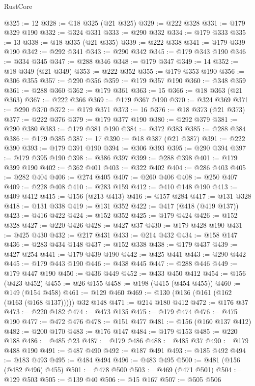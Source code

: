 \begin{lexlean}{RustCore}
\begin{coremodule}
@325 := 12
@328 := @18 @325 (@21 @325)
@329 := @222 @328
@331 := @179 @329 @190
@332 := @324 @331
@333 := @290 @332
@334 := @179 @333
@335 := 13
@338 := @18 @335 (@21 @335)
@339 := @222 @338
@341 := @179 @339 @190
@342 := @292 @341
@343 := @290 @342
@345 := @179 @343 @190
@346 := @334 @345
@347 := @288 @346
@348 := @179 @347
@349 := 14
@352 := @18 @349 (@21 @349)
@353 := @222 @352
@355 := @179 @353 @190
@356 := @306 @355
@357 := @290 @356
@359 := @179 @357 @190
@360 := @348 @359
@361 := @288 @360
@362 := @179 @361
@363 := 15
@366 := @18 @363 (@21 @363)
@367 := @222 @366
@369 := @179 @367 @190
@370 := @324 @369
@371 := @290 @370
@372 := @179 @371
@373 := 16
@376 := @18 @373 (@21 @373)
@377 := @222 @376
@379 := @179 @377 @190
@380 := @292 @379
@381 := @290 @380
@383 := @179 @381 @190
@384 := @372 @383
@385 := @288 @384
@386 := @179 @385
@387 := 17
@390 := @18 @387 (@21 @387)
@391 := @222 @390
@393 := @179 @391 @190
@394 := @306 @393
@395 := @290 @394
@397 := @179 @395 @190
@398 := @386 @397
@399 := @288 @398
@401 := @179 @399 @190
@402 := @362 @401
@403 := @322 @402
@404 := @286 @403
@405 := @282 @404
@406 := @274 @405
@407 := @260 @406
@408 := @250 @407
@409 := @228 @408
@410 := @283 @159
@412 := @410 @148 @190
@413 := @409 @412
@415 := @156 (@213 @413)
@416 := @157 @284
@417 := @131 @328
@418 := @131 @338
@419 := @131 @352
@422 := @417 (@418 (@419 @137))
@423 := @416 @422
@424 := @152 @352
@425 := @179 @424
@426 := @152 @328
@427 := @220 @426
@428 := @427 @37
@430 := @179 @428 @190
@431 := @425 @430
@432 := @217 @431
@433 := @214 @432
@434 := @158 @147
@436 := @283 @434 @148
@437 := @152 @338
@438 := @179 @437
@439 := @427 @254
@441 := @179 @439 @190
@442 := @425 @441
@443 := @290 @442
@445 := @179 @443 @190
@446 := @438 @445
@447 := @288 @446
@449 := @179 @447 @190
@450 := @436 @449
@452 := @433 @450 @412
@454 := @156 (@423 @452)
@455 := @26 @155
@458 := @198 (@415 (@454 @455))
@460 := @149 (@154 @458)
@461 := @129 @460
@469 := @130 (@136 (@161 (@162 (@163 (@168 @137))))) @32 @148
@471 := @214 @180 @412
@472 := @176 @37
@473 := @220 @182
@474 := @473 @135
@475 := @179 @474
@476 := @475 @190
@477 := @472 @476
@478 := @151 @477
@481 := @156 (@160 @137 @412)
@482 := @200 @170
@483 := @176 @147
@484 := @179 @153
@485 := @220 @188
@486 := @485 @23
@487 := @179 @486
@488 := @485 @37
@490 := @179 @488 @190
@491 := @487 @490
@492 := @187 @491
@493 := @185 @492
@494 := @183 @493
@495 := @484 @494
@496 := @483 @495
@500 := @481 (@156 (@482 @496) @455)
@501 := @478 @500
@503 := @469 (@471 @501)
@504 := @129 @503
@505 := @139 @40
@506 := @15 @167
@507 := @505 @506

\end{coremodule}
\end{lexlean}
